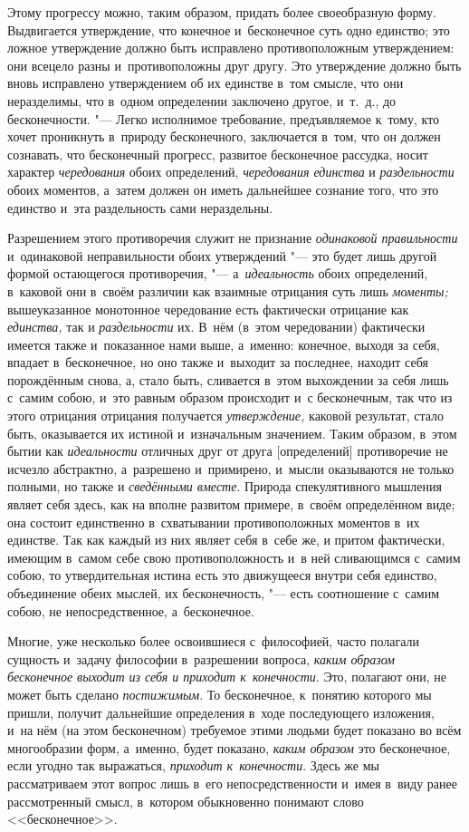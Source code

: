 Этому прогрессу можно, таким образом, придать более своеобразную форму.
Выдвигается утверждение, что конечное и~бесконечное суть одно единство; это
ложное утверждение должно быть исправлено противоположным утверждением: они
всецело разны и~противоположны друг другу. Это утверждение должно быть
вновь исправлено утверждением об их единстве в~том смысле, что они
неразделимы, что в~одном определении заключено другое, и~т.~д., до
бесконечности. "--- Легко исполнимое требование, предъявляемое к~тому, кто
хочет проникнуть в~природу бесконечного, заключается в~том, что он должен
сознавать, что бесконечный прогресс, развитое бесконечное рассудка, носит
характер {\em чередования} обоих определений,
{\em чередования единства} и
{\em раздельности} обоих моментов, а~затем должен он
иметь дальнейшее сознание того, что это единство и~эта раздельность сами
нераздельны.

Разрешением этого противоречия служит не признание
{\em одинаковой правильности} и~одинаковой
неправильности обоих утверждений "--- это будет лишь другой формой остающегося
противоречия, "--- а~{\em идеальность} обоих определений,
в~каковой они в~своём различии как взаимные отрицания суть лишь
{\em моменты;} вышеуказанное монотонное чередование
есть фактически отрицание как {\em единства,} так и
{\em раздельности} их. В~нём (в~этом чередовании)
фактически имеется также и~показанное нами выше, а~именно: конечное, выходя
за себя, впадает в~бесконечное, но оно также и~выходит за последнее,
находит себя порождённым снова, а, стало быть, сливается в~этом выхождении
за себя лишь с~самим собою, и~это равным образом происходит и~с
бесконечным, так что из этого отрицания отрицания получается
{\em утверждение,} каковой результат, стало быть,
оказывается их истиной и~изначальным значением. Таким образом, в~этом бытии
как {\em идеальности} отличных друг от друга
[определений] противоречие не исчезло абстрактно, а~разрешено и~примирено,
и~мысли оказываются не только полными, но также и
{\em сведёнными вместе}. Природа спекулятивного
мышления являет себя здесь, как на вполне развитом примере, в~своём
определённом виде; она состоит единственно в~схватывании противоположных
моментов в~их единстве. Так как каждый из них являет себя в~себе же, и
притом фактически, имеющим в~самом себе свою противоположность и~в ней
сливающимся с~самим собою, то утвердительная истина есть это движущееся
внутри себя единство, объединение обеих мыслей, их бесконечность, "--- есть
соотношение с~самим собою, не непосредственное, а~бесконечное.

Многие, уже несколько более освоившиеся с~философией, часто полагали
сущность и~задачу философии в~разрешении вопроса,
{\em каким образом бесконечное выходит из себя и
приходит к~конечности}. Это, полагают они, не может быть сделано
{\em постижимым}. То бесконечное, к~понятию которого мы
пришли, получит дальнейшие определения в~ходе последующего изложения, и~на
нём (на этом бесконечном) требуемое этими людьми будет показано во всём
многообразии форм, а~именно, будет показано, {\em каким
образом} это бесконечное, если угодно так выражаться,
{\em приходит к~конечности}. Здесь же мы рассматриваем
этот вопрос лишь в~его непосредственности и~имея в~виду ранее рассмотренный
смысл, в~котором обыкновенно понимают слово <<бесконечное>>.

